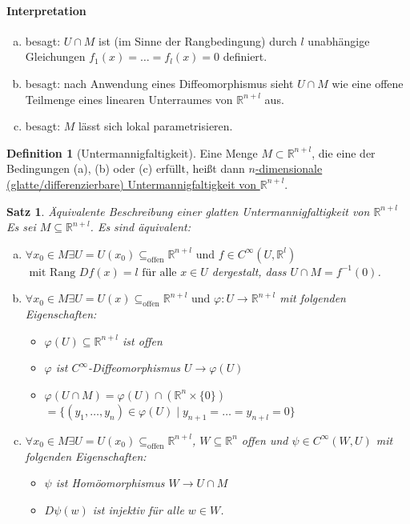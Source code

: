 \documentclass[a4paper,11pt,notitlepage]{report}
\newtheorem{theorem}{Satz}[chapter]
\theoremstyle{remark}
\theoremstyle{definition}
\newtheorem{definition}{Definition}[chapter]
\newcommand{\R}{{\ensuremath{\mathbb{R}}}}
\begin{document}
\paragraph{Interpretation}
\begin{enumerate}[(a)]
	\item besagt: $U \cap M$ ist (im Sinne der Rangbedingung) durch $l$ unabhängige Gleichungen $f_1(x) = \ldots = f_l(x) = 0$ definiert.
	\item besagt: nach Anwendung eines Diffeomorphismus sieht $U \cap M$ wie eine offene Teilmenge eines linearen Unterraumes von $\R^{n+l}$ aus.
	\item besagt: $M$ lässt sich lokal parametrisieren.
\end{enumerate}

\begin{definition}[Untermannigfaltigkeit]
Eine Menge $M \subset \R^{n+l}$, die eine der Bedingungen (a), (b) oder (c) erfüllt, heißt dann \underline{$n$-dimensionale} \underline{(glatte/differenzierbare) Untermannigfaltigkeit von $\R^{n+l}$}.
\end{definition}


\begin{theorem}{Äquivalente Beschreibung einer glatten Untermannigfaltigkeit von $\R^{n+l}$}
	Es sei $M \subseteq \R^{n+l}$. Es sind äquivalent:
	\begin{enumerate}[(a)]
		\item $\forall x_0 \in M \exists U = U(x_0) \subseteq_{\text{offen}} \R^{n+l} \text{ und } f \in C^\infty(U,\R^l)$ $\text{ mit Rang }Df(x) = l \text{ für alle } x \in U$ dergestalt, dass $U \cap M = f^{-1}(0)$.
		\item $\forall x_0 \in M \exists U = U(x) \subseteq_{\text{offen}} \R^{n+l} \text{ und } \varphi \colon U \rightarrow \R^{n+l}$ mit folgenden Eigenschaften:
			\begin{itemize}
				\item $\varphi(U) \subseteq \R^{n+l}$ ist offen
				\item $\varphi$ ist $C^\infty$-Diffeomorphismus $U \rightarrow \varphi(U)$
				\item $\varphi(U \cap M) = \varphi(U) \cap (\R^n \times \{0\})$ $= \{(y_1, \ldots, y_n) \in \varphi(U) \mid y_{n+1} = \ldots = y_{n+l} = 0\}$
			\end{itemize}
		\item $\forall x_0 \in M \exists U = U(x_0) \subseteq_{\text{offen}} \R^{n+l}$, $W \subseteq \R^n$ offen und $\psi \in C^\infty(W,U)$ mit folgenden Eigenschaften:
			\begin{itemize}
				\item $\psi$ ist Homöomorphismus $W \rightarrow U \cap M$
				\item $D\psi(w)$ ist injektiv für alle $w \in W$.
			\end{itemize}
	\end{enumerate}
\end{theorem}
\end{document}
